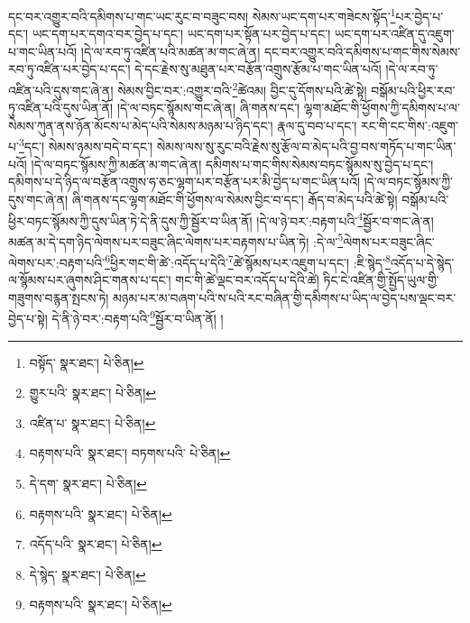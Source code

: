 དང་བར་འགྱུར་བའི་དམིགས་པ་གང་ཡང་རུང་བ་བཟུང་བས། སེམས་ཡང་དག་པར་གཟེངས་སྟོད་\footnote{བསྟོད་  སྣར་ཐང་།  པེ་ཅིན། }པར་བྱེད་པ་དང་། ཡང་དག་པར་དགའ་བར་བྱེད་པ་དང་། ཡང་དག་པར་སྟོན་པར་བྱེད་པ་དང་། ཡང་དག་པར་འཛིན་དུ་འཇུག་པ་གང་ཡིན་པའོ། །དེ་ལ་རབ་ཏུ་འཛིན་པའི་མཚན་མ་གང་ཞེ་ན། དང་བར་འགྱུར་བའི་དམིགས་པ་གང་གིས་སེམས་རབ་ཏུ་འཛིན་པར་བྱེད་པ་དང་། དེ་དང་རྗེས་སུ་མཐུན་པར་བརྩོན་འགྲུས་རྩོམ་པ་གང་ཡིན་པའོ། །དེ་ལ་རབ་ཏུ་འཛིན་པའི་དུས་གང་ཞེ་ན། སེམས་བྱིང་བར་:འགྱུར་བའི་\footnote{གྱུར་པའི་  སྣར་ཐང་།  པེ་ཅིན། }ཚེའམ། བྱིང་དུ་དོགས་པའི་ཚེ་སྟེ། བསྒོམ་པའི་ཕྱིར་རབ་ཏུ་འཛིན་པའི་དུས་ཡིན་ནོ། །དེ་ལ་བཏང་སྙོམས་གང་ཞེ་ན། ཞི་གནས་དང་། ལྷག་མཐོང་གི་ཕྱོགས་ཀྱི་དམིགས་པ་ལ་སེམས་ཀུན་ནས་ཉོན་མོངས་པ་མེད་པའི་སེམས་མཉམ་པ་ཉིད་དང་། རྣལ་དུ་བབ་པ་དང་། རང་གི་ངང་གིས་:འཇུག་པ་\footnote{འཛིན་པ་  སྣར་ཐང་།  པེ་ཅིན། }དང་། སེམས་ཉམས་བདེ་བ་དང་། སེམས་ལས་སུ་རུང་བའི་རྗེས་སུ་རྩོལ་བ་མེད་པའི་བྱ་བས་གཏོད་པ་གང་ཡིན་པའོ། །དེ་ལ་བཏང་སྙོམས་ཀྱི་མཚན་མ་གང་ཞེ་ན། དམིགས་པ་གང་གིས་སེམས་བཏང་སྙོམས་སུ་བྱེད་པ་དང་། དམིགས་པ་དེ་ཉིད་ལ་བརྩོན་འགྲུས་ཧ་ཅང་ལྷག་པར་བརྩོན་པར་མི་བྱེད་པ་གང་ཡིན་པའོ། །དེ་ལ་བཏང་སྙོམས་ཀྱི་དུས་གང་ཞེ་ན། ཞི་གནས་དང་ལྷག་མཐོང་གི་ཕྱོགས་ལ་སེམས་བྱིང་བ་དང་། རྒོད་བ་མེད་པའི་ཚེ་སྟེ། བསྒོམ་པའི་ཕྱིར་བཏང་སྙོམས་ཀྱི་དུས་ཡིན་ཏེ་དེ་ནི་དུས་ཀྱི་སྦྱོར་བ་ཡིན་ནོ། །དེ་ལ་ཉེ་བར་:བརྟག་པའི་\footnote{བརྟགས་པའི་  སྣར་ཐང་། བཏགས་པའི་  པེ་ཅིན། }སྦྱོར་བ་གང་ཞེ་ན། མཚན་མ་དེ་དག་ཉིད་ལེགས་པར་བཟུང་ཞིང་ལེགས་པར་བརྟགས་པ་ཡིན་ཏེ། :དེ་ལ་\footnote{དེ་དག་  སྣར་ཐང་།  པེ་ཅིན། }ལེགས་པར་བཟུང་ཞིང་ལེགས་པར་:བརྟག་པའི་\footnote{བརྟགས་པའི་  སྣར་ཐང་།  པེ་ཅིན། }ཕྱིར་གང་གི་ཚེ་:འདོད་པ་དེའི་\footnote{འདོད་པའི་  སྣར་ཐང་།  པེ་ཅིན། }ཚེ་སྙོམས་པར་འཇུག་པ་དང་། :ཇི་སྙེད་\footnote{དེ་སྙེད་  སྣར་ཐང་།  པེ་ཅིན། }འདོད་པ་དེ་སྙེད་ལ་སྙོམས་པར་ཞུགས་ཤིང་གནས་པ་དང་། གང་གི་ཚེ་ལྡང་བར་འདོད་པ་དེའི་ཚེ། ཏིང་ངེ་འཛིན་གྱི་སྤྱོད་ཡུལ་གྱི་གཟུགས་བརྙན་སྤངས་ཏེ། མཉམ་པར་མ་བཞག་པའི་ས་པའི་རང་བཞིན་གྱི་དམིགས་པ་ཡིད་ལ་བྱེད་པས་ལྡང་བར་བྱེད་པ་སྟེ། དེ་ནི་ཉེ་བར་:བརྟག་པའི་\footnote{བརྟགས་པའི་  སྣར་ཐང་།  པེ་ཅིན། }སྦྱོར་བ་ཡིན་ནོ། །
